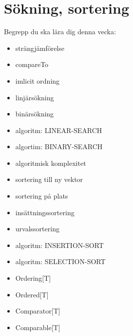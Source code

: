 \chapter{Sökning, sortering}\label{chapter:W10}
Begrepp du ska lära dig denna vecka:
\begin{itemize}[noitemsep,label={$\square$},leftmargin=*]
\item strängjämförelse
\item compareTo
\item imlicit ordning
\item linjärsökning
\item binärsökning
\item algoritm: LINEAR-SEARCH
\item algortim: BINARY-SEARCH
\item algoritmisk komplexitet
\item sortering till ny vektor
\item sortering på plats
\item insättningssortering
\item urvalssortering
\item algoritm: INSERTION-SORT
\item algoritm: SELECTION-SORT
\item Ordering[T]
\item Ordered[T]
\item Comparator[T]
\item Comparable[T]\end{itemize}
